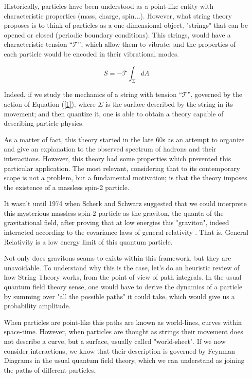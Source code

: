 \documentclass[12pt]{article}
\begin{document}
Historically, particles have been understood as a point-like entity with characteristic properties (mass, charge, spin...). However, what string theory proposes is to think of particles as a one-dimensional object, "strings" that can be opened or closed (periodic boundary conditions). This strings, would have a characteristic tension \textquotedblleft$\mathcal{T}$\textquotedblright, which allow them to vibrate; and the properties of each particle would be encoded in their vibrational modes.

\begin{equation}\label{1}
    S = -\mathcal{T}\int_\Sigma dA
\end{equation}

Indeed, if we study the mechanics of a string with tension \textquotedblleft$\mathcal{T}$\textquotedblright, governed by the action of Equation (\ref{1}), where $\Sigma$ is the surface described by the string in its movement; and then quantize it, one is able to obtain a theory capable of describing particle physics. 

As a matter of fact, this theory started in the late 60s as an attempt to organize and give an explanation to the observed spectrum of hadrons and their interactions. However, this theory had some properties which prevented this particular application. The most relevant, considering that to its contemporary scope is not a problem, but a fundamental motivation; is that the theory imposes the existence of a massless spin-2 particle.

It wasn't until 1974 when Scherk and Schwarz suggested that we could interprete this mysterious massless spin-2 particle as the graviton, the quanta of the gravitational field, after proving that at low energies this "graviton", indeed interacted according to the covariance laws of general relativity \cite{Scherk:1974ca}. That is, General Relativity is a low energy limit of this quantum particle.

Not only does gravitons seams to exists within this framework, but they are unavoidable. To understand why this is the case, let's do an heuristic review of how String Theory works, from the point of view of path integrals. In the usual quantum field theory sense, one would have to derive the dynamics of a particle by summing over "all the possible paths" it could take, which would give us a probability amplitude. 

When particles are point-like this paths are known as world-lines, curves within space-time. However, when particles are thought as strings their movement does not describe a curve, but a surface, usually called "world-sheet". If we now consider interactions, we know that their description is governed by Feynman Diagrams in the usual quantum field theory, which we can understand as joining the paths of different particles. 
\end{document}
